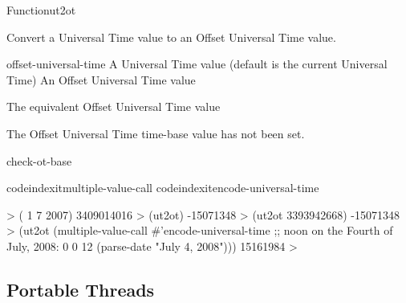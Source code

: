 \documentclass[10pt,twoside,english,pdftex]{article}
\begin{document}

\begin{functiondoc}{Function}{ut2ot}{ 
  \returns{} }
%

\fnsyntax

\fnpurpose Convert a Universal Time value to an Offset Universal Time 
value.

\fnpackage {}

\fnmodule {}

\fnargs
\begin{args}{offset-universal-time}
 A Universal Time value (default is the current
   Universal Time)
 An Offset Universal Time value
\end{args}

\fnreturns The equivalent Offset Universal Time value

\fnerrors The Offset Universal Time time-base value has not been set.

\begin{alsos}{check-ot-base}
\also[*ot-base*]
\also[ot2ut]
\end{alsos}

\fnexamples
%
codeindexit{multiple-value-call}%
codeindexit{encode-universal-time}%
%
\W\supp
\begin{example}
  > ( 1 7 2007)
  3409014016
  > (ut2ot)
  -15071348
  > (ut2ot 3393942668)
  -15071348
  > (ut2ot (multiple-value-call #'encode-universal-time 
             ;; noon on the Fourth of July, 2008:
             0 0 12 (parse-date "July 4, 2008")))
  15161984
  >
\end{example}

\end{functiondoc}


\T\markright{}%
\T\pagestyle{plain}
\T\clearpage
\W{}
\T\pagestyle{fancy}
\T\thispagestyle{fancybottom}
\T\global\def\fnlastname{ }%

\subsection{Portable Threads}
\label{sec:portablethreads}%
\end{document}
